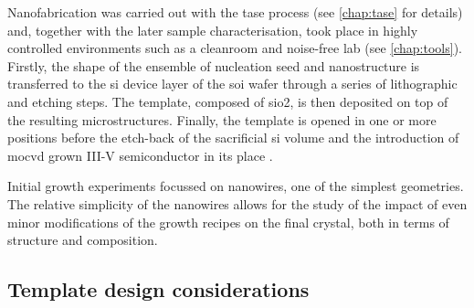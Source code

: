 Nanofabrication was carried out with the \acs{tase} process (see \autoref{chap:tase} for details) and, together with the later sample characterisation, took place in highly controlled environments such as a cleanroom and noise-free lab (see \autoref{chap:tools}). Firstly, the shape of the ensemble of nucleation seed and nanostructure is transferred to the \acl{si} device layer of the \acs{soi} wafer through a series of lithographic and etching steps. The template, composed of \acs{sio2}, is then deposited on top of the resulting microstructures. Finally, the template is opened in one or more positions before the etch-back of the sacrificial \acl{si} volume and the introduction of \acf{mocvd} grown III-V semiconductor in its place \cite{Schmid2015, borgTASEp2018}.
\par
Initial growth experiments focussed on nanowires, one of the simplest geometries. The relative simplicity of the nanowires allows for the study of the impact of even minor modifications of the growth recipes on the final crystal, both in terms of structure and composition.

\subsection{Template design considerations}

